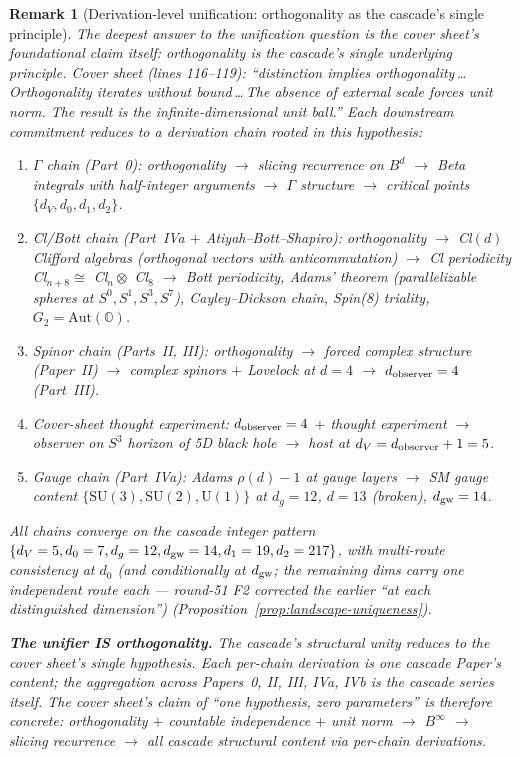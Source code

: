 \documentclass[12pt,a4paper]{article}
\newtheorem*{remark}{Remark}
\begin{document}
\begin{remark}[Derivation-level unification: orthogonality as the cascade's single principle]\label{rem:orthogonality-unifier}
The deepest answer to the unification question is the cover sheet's foundational claim itself: \emph{orthogonality} is the cascade's single underlying principle. Cover sheet (lines 116--119): ``distinction implies orthogonality\,\ldots\,Orthogonality iterates without bound\,\ldots\,The absence of external scale forces unit norm. The result is the infinite-dimensional unit ball.'' Each downstream commitment reduces to a derivation chain rooted in this hypothesis:
\begin{enumerate}[nosep]
\item \emph{$\Gamma$ chain (Part~0):} orthogonality $\to$ slicing recurrence on $B^d$ $\to$ Beta integrals with half-integer arguments $\to$ $\Gamma$ structure $\to$ critical points $\{d_V, d_0, d_1, d_2\}$.
\item \emph{Cl/Bott chain (Part~IVa $+$ Atiyah--Bott--Shapiro):} orthogonality $\to$ Cl$(d)$ Clifford algebras (orthogonal vectors with anticommutation) $\to$ Cl periodicity Cl$_{n+8} \cong$ Cl$_n \otimes$ Cl$_8$ $\to$ Bott periodicity, Adams' theorem (parallelizable spheres at $S^0, S^1, S^3, S^7$), Cayley--Dickson chain, Spin(8) triality, $G_2 = \mathrm{Aut}(\mathbb{O})$.
\item \emph{Spinor chain (Parts~II, III):} orthogonality $\to$ forced complex structure (Paper~II) $\to$ complex spinors $+$ Lovelock at $d=4$ $\to$ $d_{\rm observer} = 4$ (Part~III).
\item \emph{Cover-sheet thought experiment:} $d_{\rm observer} = 4$ $+$ thought experiment $\to$ observer on $S^3$ horizon of 5D black hole $\to$ host at $d_V = d_{\rm observer} + 1 = 5$.
\item \emph{Gauge chain (Part~IVa):} Adams $\rho(d)-1$ at gauge layers $\to$ SM gauge content $\{\mathrm{SU}(3), \mathrm{SU}(2), \mathrm{U}(1)\}$ at $d_g=12$, $d=13$ (broken), $d_{\rm gw}=14$.
\end{enumerate}
All chains converge on the cascade integer pattern $\{d_V=5, d_0=7, d_g=12, d_{\rm gw}=14, d_1=19, d_2=217\}$, with multi-route consistency at $d_0$ (and conditionally at $d_{\rm gw}$; the remaining dims carry one independent route each --- round-51 F2 corrected the earlier ``at each distinguished dimension'') (Proposition~\ref{prop:landscape-uniqueness}).

\medskip\noindent\textbf{The unifier IS orthogonality.} The cascade's structural unity reduces to the cover sheet's single hypothesis. Each per-chain derivation is one cascade Paper's content; the aggregation across Papers~0, II, III, IVa, IVb is the cascade series itself. The cover sheet's claim of ``one hypothesis, zero parameters'' is therefore concrete: orthogonality $+$ countable independence $+$ unit norm $\to$ $B^\infty$ $\to$ slicing recurrence $\to$ all cascade structural content via per-chain derivations.


\end{remark}
\end{document}
